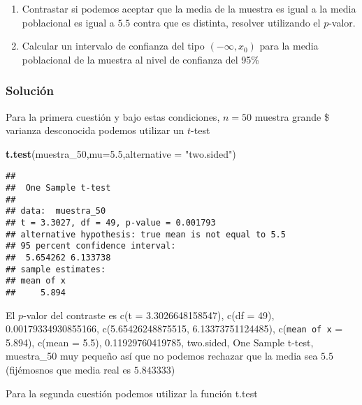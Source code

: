 \documentclass[
]{article}
\newenvironment{Shaded}{\begin{snugshade}}{\end{snugshade}}
\newcommand{\DataTypeTok}[1]{\textcolor[rgb]{0.13,0.29,0.53}{#1}}
\newcommand{\DecValTok}[1]{\textcolor[rgb]{0.00,0.00,0.81}{#1}}
\newcommand{\FloatTok}[1]{\textcolor[rgb]{0.00,0.00,0.81}{#1}}
\newcommand{\KeywordTok}[1]{\textcolor[rgb]{0.13,0.29,0.53}{\textbf{#1}}}
\newcommand{\NormalTok}[1]{#1}
\newcommand{\OperatorTok}[1]{\textcolor[rgb]{0.81,0.36,0.00}{\textbf{#1}}}
\newcommand{\StringTok}[1]{\textcolor[rgb]{0.31,0.60,0.02}{#1}}
\providecommand{\tightlist}{%
  \setlength{\itemsep}{0pt}\setlength{\parskip}{0pt}}
\begin{document}
\begin{enumerate}
\def\labelenumi{\arabic{enumi}.}
\tightlist
\item
  Contrastar si podemos aceptar que la media de la muestra es igual a la
  media poblacional es igual a \(5.5\) contra que es distinta, resolver
  utilizando el \(p\)-valor.
\item
  Calcular un intervalo de confianza del tipo \((-\infty,x_0)\) para la
  media poblacional de la muestra al nivel de confianza del 95\%
\end{enumerate}

\hypertarget{soluciuxf3n}{%
\subsubsection{Solución}\label{soluciuxf3n}}

Para la primera cuestión y bajo estas condiciones, \(n=50\) muestra
grande \$ varianza desconocida podemos utilizar un \(t\)-test

\begin{Shaded}
\begin{Highlighting}[]
\KeywordTok{t.test}\NormalTok{(muestra_}\DecValTok{50}\NormalTok{,}\DataTypeTok{mu=}\FloatTok{5.5}\NormalTok{,}\DataTypeTok{alternative =} \StringTok{"two.sided"}\NormalTok{)}
\end{Highlighting}
\end{Shaded}

\begin{verbatim}
## 
##  One Sample t-test
## 
## data:  muestra_50
## t = 3.3027, df = 49, p-value = 0.001793
## alternative hypothesis: true mean is not equal to 5.5
## 95 percent confidence interval:
##  5.654262 6.133738
## sample estimates:
## mean of x 
##     5.894
\end{verbatim}

El \(p\)-valor del contraste es c(t = 3.3026648158547), c(df = 49),
0.00179334930855166, c(5.65426248875515, 6.13373751124485),
c(\texttt{mean\ of\ x} = 5.894), c(mean = 5.5), 0.11929760419785,
two.sided, One Sample t-test, muestra\_50 muy pequeño así que no podemos
rechazar que la media sea \(5.5\) (fijémosnos que media real es
\(5.843333\))

Para la segunda cuestión podemos utilizar la función t.test

\begin{Shaded}
\end{Shaded}
\end{document}
